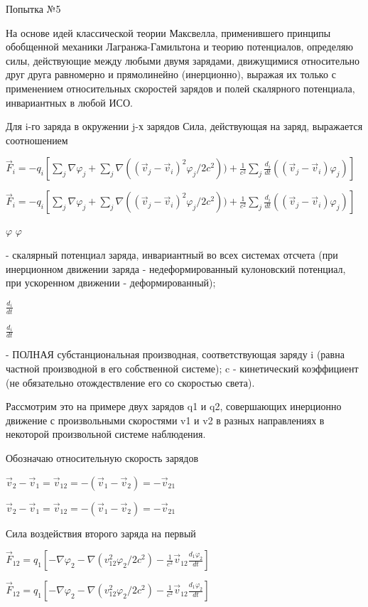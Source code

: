 \documentclass{article}
\begin{document}
			Попытка №5

На основе идей классической теории Максвелла, применившего принципы обобщенной механики Лагранжа-Гамильтона и теорию потенциалов, определяю силы, действующие между любыми двумя зарядами, движущимися относительно друг друга равномерно и прямолинейно (инерционно), выражая их только с применением относительных скоростей зарядов и полей скалярного потенциала, инвариантных в любой ИСО.

Для i-го заряда в окружении j-х зарядов Сила, действующая на заряд, выражается соотношением

$\vec F_i=-q_i\left [\sum_j\nabla\varphi_j+\sum_j\nabla((\vec v_j-\vec v_i)^2\varphi_j/2c^2))+\frac{1}{c^2}\sum_j\frac{d_i}{dt}((\vec v_j-\vec v_i)\varphi_j)\right ]$

$\vec F_i=-q_i\left [\sum_j\nabla\varphi_j+\sum_j\nabla((\vec v_j-\vec v_i)^2\varphi_j/2c^2))+\frac{1}{c^2}\sum_j\frac{d_i}{dt}((\vec v_j-\vec v_i)\varphi_j)\right ]$

$\varphi$
$\varphi$

 - скалярный потенциал заряда, инвариантный во всех системах отсчета (при инерционном движении заряда - недеформированный кулоновский потенциал, при ускоренном движении - деформированный);

$\frac{d_i}{dt}$

$\frac{d_i}{dt}$

- ПОЛНАЯ субстанциональная производная, соответствующая заряду i (равна частной производной в его собственной системе); c - кинетический коэффициент (не обязательно отождествление его со скоростью света).

Рассмотрим это на примере двух зарядов q1 и q2, совершающих инерционно движение с произвольными скоростями v1 и v2 в разных направлениях в некоторой произвольной системе наблюдения.

Обозначаю относительную скорость зарядов

$\vec v_2-\vec v_1=\vec v_{12}=-(\vec v_1-\vec v_2)=-\vec v_{21}$

$\vec v_2-\vec v_1=\vec v_{12}=-(\vec v_1-\vec v_2)=-\vec v_{21}$

Сила воздействия второго заряда на первый

$\vec F_{12}=q_1\left [-\nabla\varphi_2-\nabla(v_{12}^2\varphi_2/2c^2)-\frac{1}{c^2}\vec v_{12} \frac{d_1\varphi_2}{dt}\right ]$

$\vec F_{12}=q_1\left [-\nabla\varphi_2-\nabla(v_{12}^2\varphi_2/2c^2)-\frac{1}{c^2}\vec v_{12} \frac{d_1\varphi_2}{dt}\right ]$
\end{document}

